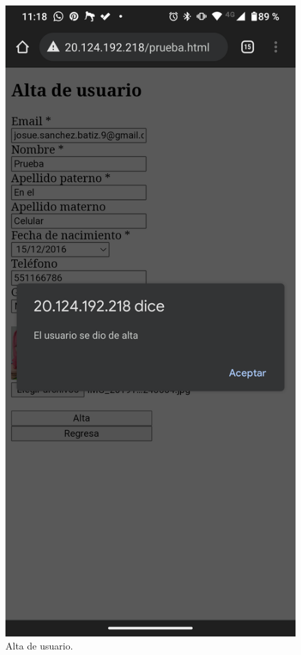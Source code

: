 \documentclass[11pt]{article}
\begin{document}
		\begin{figure}[H]
			\centering
			\includegraphics[scale=0.18]{resources/Screenshot_20211219-231804.png}
			\caption{Alta de usuario.}\label{fig:picture}
		\end{figure}
\end{document}
